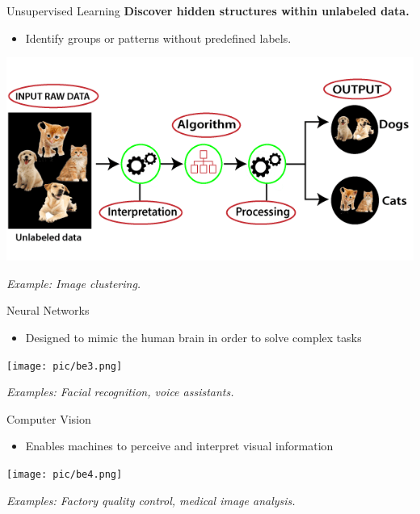 \documentclass[serif, aspectratio=169]{beamer}
\begin{document}
\begin{frame}{Unsupervised Learning}
\textbf{Discover hidden structures within unlabeled data.}

\begin{itemize}
    \item Identify groups or patterns without predefined labels.
\end{itemize}

\begin{center}
    \includegraphics[width=0.7\linewidth]{pic/be2.png}
\end{center}

\begin{center}
\textit{Example: Image clustering.}
\end{center}
\end{frame}



\begin{frame}{Neural Networks}
    \begin{itemize}
        \item Designed to mimic the human brain in order to solve complex tasks
    \end{itemize}
    \vspace{0.4cm}
    \begin{center}
        \texttt{[image: pic/be3.png]}
    \end{center}
    \vspace{0.3cm}
    \begin{center}
        \textit{Examples: Facial recognition, voice assistants.}
    \end{center}
\end{frame}

\begin{frame}{Computer Vision}
    \begin{itemize}
        \item Enables machines to perceive and interpret visual information
    \end{itemize}
    \begin{center}
        \texttt{[image: pic/be4.png]} 
    \end{center}
    \begin{center}
        \textit{Examples: Factory quality control, medical image analysis.}
    \end{center}
\end{frame}
\end{document}
